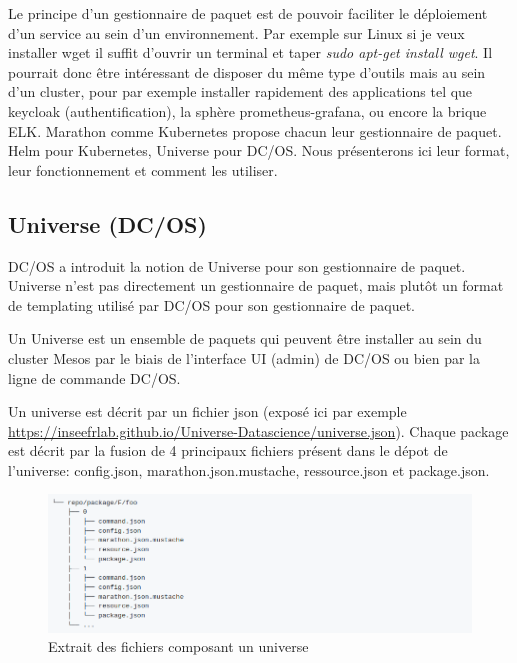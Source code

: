 \documentclass[11pt,fleqn]{book} %
\begin{document}
Le principe d'un gestionnaire de paquet est de pouvoir faciliter le déploiement d'un service au sein d'un environnement. Par exemple sur Linux si je veux installer wget il suffit d'ouvrir un terminal et taper \textit{sudo apt-get install wget}. Il pourrait donc être intéressant de disposer du même type d'outils mais au sein d'un cluster, pour par exemple installer rapidement des applications tel que keycloak (authentification), la sphère prometheus-grafana, ou encore la brique ELK. Marathon comme Kubernetes propose chacun leur gestionnaire de paquet. Helm pour Kubernetes, Universe pour DC/OS. Nous présenterons ici leur format, leur fonctionnement et comment les utiliser.

\subsection{Universe (DC/OS)}
DC/OS a introduit la notion de Universe pour son gestionnaire de paquet. Universe n'est pas directement un gestionnaire de paquet, mais plutôt un format de templating utilisé par DC/OS pour son gestionnaire de paquet. \newline

Un Universe est un ensemble de paquets qui peuvent être installer au sein du cluster Mesos par le biais de l'interface UI (admin) de DC/OS ou bien par la ligne de commande DC/OS.\newline


Un universe est décrit par un fichier json (exposé ici par exemple \url{https://inseefrlab.github.io/Universe-Datascience/universe.json}). Chaque package est décrit par la fusion de 4 principaux fichiers présent dans le dépot de l'universe: config.json, marathon.json.mustache, ressource.json et package.json.

\begin{figure}[H]\centering
\renewcommand{\figurename}{Graphique}
\includegraphics[scale=0.5,trim={0 0 20cm 0},clip ]{Pictures/Comparaison/deployer/universe/universe-repo.png}
\captionsetup{margin=1.5cm,format=hang,justification=justified}
\caption[]{Extrait des fichiers composant un universe \newline}
\end{figure}
\end{document}
